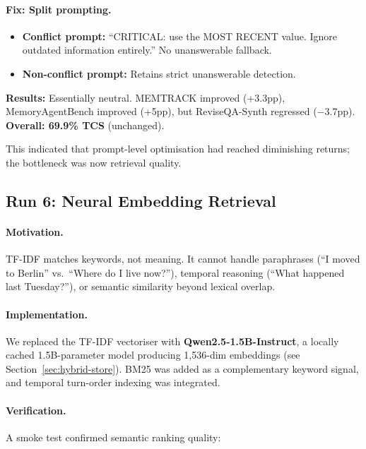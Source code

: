 \documentclass[11pt,a4paper]{article}
\begin{document}
\paragraph{Fix: Split prompting.}
\begin{itemize}[nosep]
    \item \textbf{Conflict prompt:} ``CRITICAL: use the MOST RECENT value.
          Ignore outdated information entirely.'' No unanswerable fallback.
    \item \textbf{Non-conflict prompt:} Retains strict unanswerable detection.
\end{itemize}

\textbf{Results:}
Essentially neutral.  MEMTRACK improved (+3.3pp), MemoryAgentBench improved
(+5pp), but ReviseQA-Synth regressed ($-$3.7pp).
\textbf{Overall: 69.9\% TCS} (unchanged).

This indicated that prompt-level optimisation had reached diminishing returns;
the bottleneck was now retrieval quality.


\subsection{Run 6: Neural Embedding Retrieval}
\label{sec:embeddings}

\paragraph{Motivation.}
TF-IDF matches keywords, not meaning.  It cannot handle paraphrases
(``I moved to Berlin'' vs.\ ``Where do I live now?''), temporal reasoning
(``What happened last Tuesday?''), or semantic similarity beyond lexical
overlap.

\paragraph{Implementation.}
We replaced the TF-IDF vectoriser with \textbf{Qwen2.5-1.5B-Instruct},
a locally cached 1.5B-parameter model producing 1{,}536-dim embeddings
(see Section~\ref{sec:hybrid-store}).  BM25 was added as a complementary
keyword signal, and temporal turn-order indexing was integrated.

\paragraph{Verification.}
A smoke test confirmed semantic ranking quality:
\end{document}

